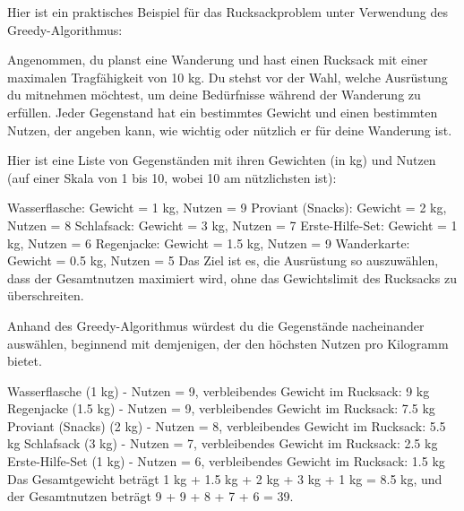 \documentclass[12pt]{report}
\begin{document}
	
	
	
	Hier ist ein praktisches Beispiel für das  Rucksackproblem unter Verwendung des Greedy-Algorithmus:
	
	Angenommen, du planst eine Wanderung und hast einen Rucksack mit einer maximalen Tragfähigkeit von 10 kg. Du stehst vor der Wahl, welche Ausrüstung du mitnehmen möchtest, um deine Bedürfnisse während der Wanderung zu erfüllen. Jeder Gegenstand hat ein bestimmtes Gewicht und einen bestimmten Nutzen, der angeben kann, wie wichtig oder nützlich er für deine Wanderung ist.
	
	Hier ist eine Liste von Gegenständen mit ihren Gewichten (in kg) und Nutzen (auf einer Skala von 1 bis 10, wobei 10 am nützlichsten ist):
	
	Wasserflasche: Gewicht = 1 kg, Nutzen = 9
	Proviant (Snacks): Gewicht = 2 kg, Nutzen = 8
	Schlafsack: Gewicht = 3 kg, Nutzen = 7
	Erste-Hilfe-Set: Gewicht = 1 kg, Nutzen = 6
	Regenjacke: Gewicht = 1.5 kg, Nutzen = 9
	Wanderkarte: Gewicht = 0.5 kg, Nutzen = 5
	Das Ziel ist es, die Ausrüstung so auszuwählen, dass der Gesamtnutzen maximiert wird, ohne das Gewichtslimit des Rucksacks zu überschreiten.
	
	Anhand des Greedy-Algorithmus würdest du die Gegenstände nacheinander auswählen, beginnend mit demjenigen, der den höchsten Nutzen pro Kilogramm bietet.
	
	Wasserflasche (1 kg) - Nutzen = 9, verbleibendes Gewicht im Rucksack: 9 kg
	Regenjacke (1.5 kg) - Nutzen = 9, verbleibendes Gewicht im Rucksack: 7.5 kg
	Proviant (Snacks) (2 kg) - Nutzen = 8, verbleibendes Gewicht im Rucksack: 5.5 kg
	Schlafsack (3 kg) - Nutzen = 7, verbleibendes Gewicht im Rucksack: 2.5 kg
	Erste-Hilfe-Set (1 kg) - Nutzen = 6, verbleibendes Gewicht im Rucksack: 1.5 kg
	Das Gesamtgewicht beträgt 1 kg + 1.5 kg + 2 kg + 3 kg + 1 kg = 8.5 kg, und der Gesamtnutzen beträgt 9 + 9 + 8 + 7 + 6 = 39.
	
\end{document}
